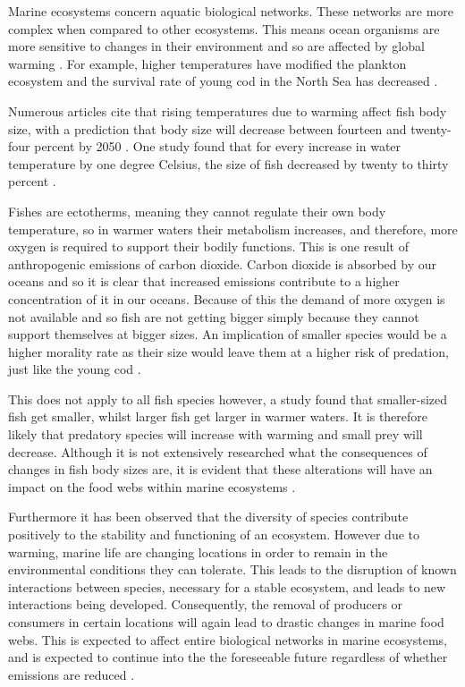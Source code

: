 \documentclass{article}
\begin{document}
Marine ecosystems concern aquatic biological networks. These networks are more complex when compared to other ecosystems. This means ocean organisms are more sensitive to changes in their environment and so are affected by global warming \cite{3}. For example, higher temperatures have modified the plankton ecosystem and the survival rate of young cod in the North Sea has decreased \cite{4}.

Numerous articles cite that rising temperatures due to warming affect fish body size, with a prediction that body size will decrease between fourteen and twenty-four percent by 2050 \cite{5}. One study found that for every increase in water temperature by one degree Celsius, the size of fish decreased by twenty to thirty percent \cite{6}. 

Fishes are ectotherms, meaning they cannot regulate their own body temperature, so in warmer waters their metabolism increases, and therefore, more oxygen is required to support their bodily functions. This is one result of anthropogenic emissions of carbon dioxide. Carbon dioxide is absorbed by our oceans and so it is clear that increased emissions contribute to a higher concentration of it in our oceans. Because of this the demand of more oxygen is not available and so fish are not getting bigger simply because they cannot support themselves at bigger sizes. An implication of smaller species would be a higher morality rate as their size would leave them at a higher risk of predation, just like the young cod \cite{6}.

This does not apply to all fish species however, a study found that smaller-sized fish get smaller, whilst larger fish get larger in warmer waters. It is therefore likely that predatory species will increase with warming and small prey will decrease. Although it is not extensively researched what the consequences of changes in fish body sizes are, it is evident that these alterations will have an impact on the food webs within marine ecosystems \cite{7}.

Furthermore it has been observed that the diversity of species contribute positively to the stability and functioning of an ecosystem. However due to warming, marine life are changing locations in order to remain in the environmental conditions they can tolerate. This leads to the disruption of known interactions between species, necessary for a stable ecosystem, and leads to new interactions being developed. Consequently, the removal of producers or consumers in certain locations will again lead to drastic changes in marine food webs. This is expected to affect entire biological networks in marine ecosystems, and is expected to continue into the the foreseeable future regardless of whether emissions are reduced \cite{8}.
\end{document}
